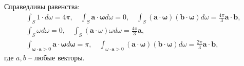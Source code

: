 \begin{lemma}
    \label{lm:1:1}
    Справедливы равенства:
    \[
        \begin{gathered}
            \int_{S} 1 \cdot d \omega=4 \pi, \quad \int_{S} \mathbf{a}
            \cdot \boldsymbol{\omega} d \omega=0,
            \quad \int_{S}(\mathbf{a} \cdot \boldsymbol{\omega})(\mathbf{b} \cdot \boldsymbol{\omega}) d
            \omega=\frac{4 \pi}{3} \mathbf{a} \cdot \mathbf{b}, \\
            \int_{S} \omega d \omega=0, \quad \int_{S}(\mathbf{a} \cdot \omega) \omega d
            \omega=\frac{4 \pi}{3} \mathbf{a}, \\
            \int_{\boldsymbol{\omega} \cdot \mathbf{a}>0} \mathbf{a} \cdot \boldsymbol{\omega} d
            \boldsymbol{\omega}=\pi, \quad \int_{\omega \cdot \mathbf{a}>0}(\mathbf{a} \cdot
            \boldsymbol{\omega})(\mathbf{b} \cdot \boldsymbol{\omega}) d \omega
            =\frac{2 \pi}{3} \mathbf{a} \cdot \mathbf{b},
        \end{gathered}
    \]
    где $a, b$ -- любые векторы.
\end{lemma}
